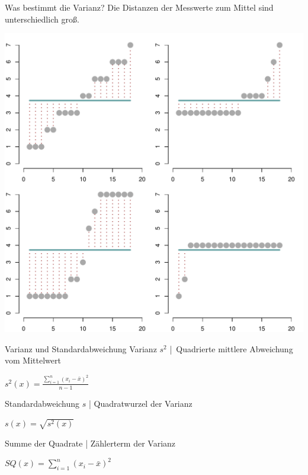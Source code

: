 \begin{frame}
  {Was bestimmt die Varianz?}
  Die \alert{Distanzen der Messwerte zum Mittel} sind unterschiedlich groß.\\
  \begin{center}
    \includegraphics[height=0.7\textheight]{RVorlesung/fourvariances}
  \end{center}
\end{frame}


\begin{frame}
  {Varianz und Standardabweichung}
  \alert{Varianz $s^2$} | Quadrierte \alert{mittlere Abweichung} vom Mittelwert\\
      \begin{center}
	\alert{$s^2(x)=\frac{ \sum\limits_{i=1}^{n}(x_i-\bar{x})^2}{n-1}$}
      \end{center}
\pause
      \vspace{0.5cm}
    \alert{Standardabweichung $s$} | Quadratwurzel der Varianz\\
      \begin{center}
	\alert{$s(x)=\sqrt{s^2(x)}$}
      \end{center}
      \vspace{0.5cm}

  \pause
    \alert{Summe der Quadrate} | Zählerterm der Varianz\\
  \begin{center}
    $SQ(x)=\sum\limits_{i=1}^{n}(x_i-\bar{x})^2$
  \end{center}
\end{frame}

